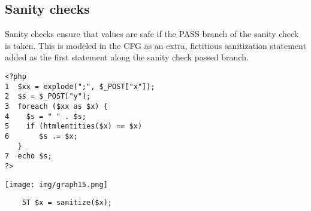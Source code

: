 \documentclass[a4paper, 10pt, titlepage]{article}
\begin{document}
\subsection{Sanity checks}
Sanity checks ensure that values are safe if the PASS branch of the sanity check is taken. This is modeled in the CFG as an extra, fictitious sanitization statement added as the first statement along the sanity check passed branch. \\
\begin{minipage}{0.5\textwidth}
\begin{small}
\begin{lstlisting}
<?php 
1  $xx = explode(";", $_POST["x"]); 
2  $s = $_POST["y"]; 
3  foreach ($xx as $x) { 
4    $s = " " . $s; 
5    if (htmlentities($x) == $x) 
6       $s .= $x;    
   } 
7  echo $s; 
?>
\end{lstlisting}
\end{small}
\end{minipage}
\hfill\vline\hfill
\begin{minipage}{0.4\textwidth}
\begin{center}
\texttt{[image: img/graph15.png]}
\end{center}
\begin{lstlisting}
	5T $x = sanitize($x);
\end{lstlisting}
\end{minipage}
\end{document}
